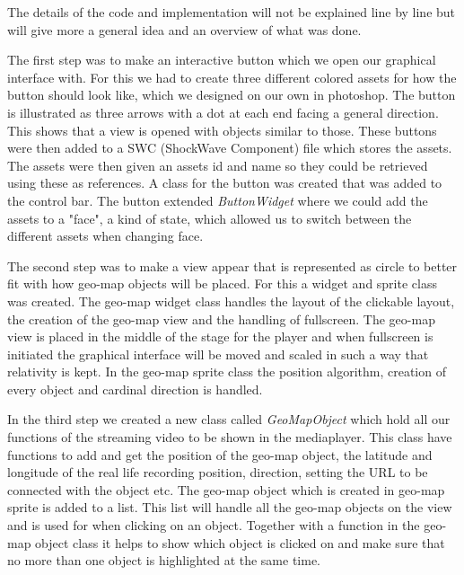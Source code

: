 The details of the code and implementation will not be explained line by line but will give more a general idea and an overview of what was done.

The first step was to make an interactive button which we open our graphical interface with. For this we had to create three different colored assets for how the button should look like, which we designed on our own in photoshop. The button is illustrated as three arrows with a dot at each end facing a general direction. This shows that a view is opened with objects similar to those. These buttons were then added to a SWC (ShockWave Component) file which stores the assets. The assets were then given an assets id and name so they could be retrieved using these as references. A class for the button was created that was added to the control bar. The button extended \textit{ButtonWidget} where we could add the assets to a "face", a kind of state, which allowed us to switch between the different assets when changing face. 

The second step was to make a view appear that is represented as circle to better fit with how geo-map objects will be placed. For this a widget and sprite class was created. The geo-map widget class handles the layout of the clickable layout, the creation of the geo-map view and the handling of fullscreen. The geo-map view is placed in the middle of the stage for the player and when fullscreen is initiated the graphical interface will be moved and scaled in such a way that relativity is kept. In the geo-map sprite class the position algorithm, creation of every object and cardinal direction is handled.

In the third step we created a new class called \textit{GeoMapObject} which hold all our functions of the streaming video to be shown in the mediaplayer. This class have functions to add and get the position of the geo-map object, the latitude and longitude of the real life recording position, direction, setting the URL to be connected with the object etc. The geo-map object which is created in geo-map sprite is added to a list. This list will handle all the geo-map objects on the view and is used for when clicking on an object. Together with a function in the geo-map object class it helps to show which object is clicked on and make sure that no more than one object is highlighted at the same time.

